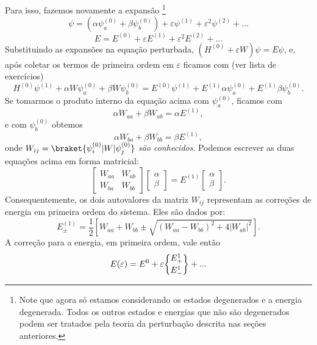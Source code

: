 \documentclass{article}
\newcommand*{\bfrac}[2]{\genfrac{\lbrace}{\rbrace}{0pt}{}{#1}{#2}}
\begin{document}
Para isso, fazemos novamente a expansão \footnote{Note que agora só estamos considerando os estados degenerados e a energia degenerada. Todos os outros estados e energias que não são degenerados podem ser tratados pela teoria da perturbação descrita nas seções anteriores.}
\begin{equation}
    \psi = (\alpha\psi_a^{(0)} + \beta\psi_b^{(0)}) + \varepsilon\psi^{(1)} + \varepsilon^{2}\psi^{(2)} + ...
\end{equation}
\begin{equation}
    E = E^{(0)} + \varepsilon E^{(1)} + \varepsilon^{2} E^{(2)} + ...
\end{equation}
Substituindo as expansões na equação perturbada, $(H^{(0)} + \varepsilon W)\psi = E\psi$, e, após coletar os termos de primeira ordem em $\varepsilon$ ficamos com (ver lista de exercícios)
\begin{equation}
    H^{(0)}\psi^{(1)} + \alpha W\psi_a^{(0)} + \beta W\psi_b^{(0)} = E^{(0)}\psi^{(1)} + E^{(1)}\alpha\psi_a^{(0)} + E^{(1)}\beta\psi_b^{(0)}.
\end{equation}
Se tomarmos o produto interno da equação acima com $\psi_a^{(0)}$, ficamos com
\begin{equation}
    \alpha W_{aa} + \beta W_{ab} = \alpha E^{(1)},
\end{equation}
e com $\psi_b^{(0)}$ obtemos
\begin{equation}
    \alpha W_{ba} + \beta W_{bb} = \beta E^{(1)},    
\end{equation}
onde $W_{ij} = \braket{\psi_i^{(0)}|W|\psi_j^{(0)}}$ \textit{são conhecidos}. Podemos escrever as duas equações acima em forma matricial:
\begin{equation}
    \begin{bmatrix}
    W_{aa} & W_{ab} \\
    W_{ba} & W_{bb}
\end{bmatrix}
    \begin{bmatrix}
    \alpha  \\
    \beta 
\end{bmatrix} 
=
E^{(1)}    \begin{bmatrix}
    \alpha  \\
    \beta 
\end{bmatrix} .
\end{equation}
Consequentemente, os dois autovalores da matriz $W_{ij}$ representam as correções de energia em primeira ordem do sistema. Eles são dados por:
\begin{equation}
    E^{(1)}_\pm = \frac{1}{2}\left[ W_{aa} + W_{bb} \pm \sqrt{(W_{aa}-W_{bb})^{2} + 4|W_{ab}|^2} \right].
\end{equation}
A correção para a energia, em primeira ordem, vale então
\begin{equation}
    E(\varepsilon) = E^{0} + \varepsilon\bfrac{E^{1}_{+}}{E^{1}_{-}} + ...
\end{equation}
\end{document}
